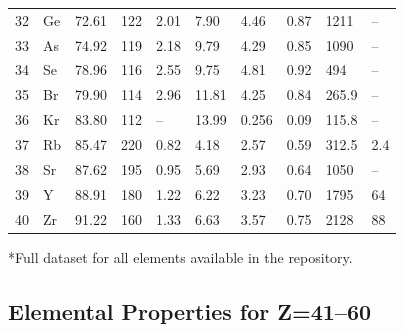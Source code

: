 \documentclass[12pt,a4paper]{article}
\begin{document}
\begin{longtable}{p{0.6cm}p{1.2cm}p{1.2cm}p{1.2cm}p{1.2cm}p{1.2cm}p{1.5cm}p{1.2cm}p{1.2cm}p{1.2cm}}
		32 & Ge & 72.61 & 122 & 2.01 & 7.90 & 4.46 & 0.87 & 1211 & – \\
		33 & As & 74.92 & 119 & 2.18 & 9.79 & 4.29 & 0.85 & 1090 & – \\
		34 & Se & 78.96 & 116 & 2.55 & 9.75 & 4.81 & 0.92 & 494 & – \\
		35 & Br & 79.90 & 114 & 2.96 & 11.81 & 4.25 & 0.84 & 265.9 & – \\
		36 & Kr & 83.80 & 112 & –    & 13.99 & 0.256 & 0.09 & 115.8 & – \\
		37 & Rb & 85.47 & 220 & 0.82 & 4.18 & 2.57 & 0.59 & 312.5 & 2.4 \\
		38 & Sr & 87.62 & 195 & 0.95 & 5.69 & 2.93 & 0.64 & 1050 & – \\
		39 & Y  & 88.91 & 180 & 1.22 & 6.22 & 3.23 & 0.70 & 1795 & 64 \\
		40 & Zr & 91.22 & 160 & 1.33 & 6.63 & 3.57 & 0.75 & 2128 & 88 \\
		\bottomrule
	\end{longtable}
	*Full dataset for all elements available in the repository.
	
	\subsection*{Elemental Properties for Z=41–60}
	
\end{document}
